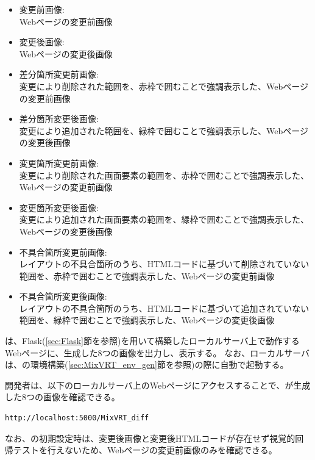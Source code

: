 \begin{itemize}
    \item 変更前画像:\\
          Webページの変更前画像
    \item 変更後画像:\\
          Webページの変更後画像
    \item 差分箇所変更前画像:\\
          変更により削除された範囲を、赤枠で囲むことで強調表示した、Webページの変更前画像
    \item 差分箇所変更後画像:\\
          変更により追加された範囲を、緑枠で囲むことで強調表示した、Webページの変更後画像
    \item 変更箇所変更前画像:\\
          変更により削除された画面要素の範囲を、赤枠で囲むことで強調表示した、Webページの変更前画像
    \item 変更箇所変更後画像:\\
          変更により追加された画面要素の範囲を、緑枠で囲むことで強調表示した、Webページの変更後画像
    \item 不具合箇所変更前画像:\\
          レイアウトの不具合箇所のうち、HTMLコードに基づいて削除されていない範囲を、赤枠で囲むことで強調表示した、Webページの変更前画像
    \item 不具合箇所変更後画像:\\
          レイアウトの不具合箇所のうち、HTMLコードに基づいて追加されていない範囲を、緑枠で囲むことで強調表示した、Webページの変更後画像
\end{itemize}
\toolName は、Flask(\ref{sec:Flask}節を参照)を用いて構築したローカルサーバ上で動作するWebページに、生成した8つの画像を出力し、表示する。
なお、ローカルサーバは、\toolName の環境構築(\ref{sec:MixVRT_env_gen}節を参照)の際に自動で起動する。
\par
開発者は、以下のローカルサーバ上のWebページにアクセスすることで、\toolName が生成した8つの画像を確認できる。
\begin{lstlisting}[label=list:command3,frame=none,numbers=none,basicstyle={\normalsize \ttfamily \color[gray]{.15}}]
    http://localhost:5000/MixVRT_diff
   \end{lstlisting}
なお、\toolName の初期設定時は、変更後画像と変更後HTMLコードが存在せず視覚的回帰テストを行えないため、Webページの変更前画像のみを確認できる。

